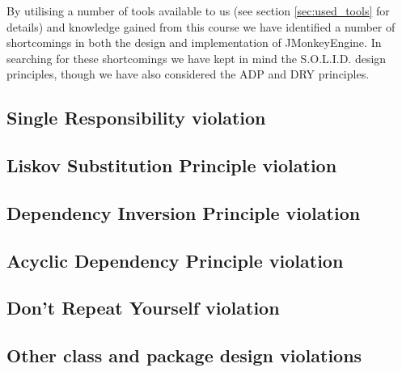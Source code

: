 \documentclass[a4paper, 10pt]{article}
\begin{document}
By utilising a number of tools available to us (see section
\ref{sec:used_tools} for details) and knowledge gained from this
course we have identified a number of shortcomings in both the design
and implementation of JMonkeyEngine. In searching for these
shortcomings we have kept in mind the  S.O.L.I.D. design principles,
though we have also considered the ADP and DRY principles.

\subsection{Single Responsibility violation}
\label{sec:srp_violation}


\subsection{Liskov Substitution Principle violation}
\label{sec:lsp_violation} %



\subsection{Dependency Inversion Principle violation}
\label{sec:dip_violation}


\subsection{Acyclic Dependency Principle violation}
\label{sec:adp_violation}


\subsection{Don't Repeat Yourself violation}
\label{sec:dry_violation}


\subsection{Other class and package design violations}
\label{sec:other_violations}
\end{document}
